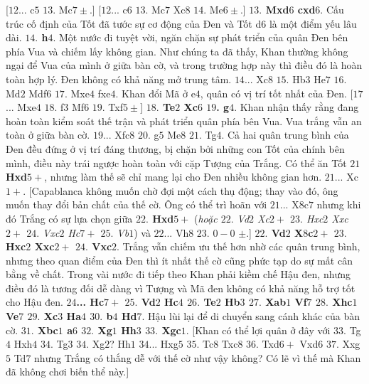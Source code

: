\begin{multicols}{2}
	\vskip 0.1cm
	[$12$... c$5$ $13.$ Mc$7\pm$.]
	\vskip 0.1cm
	[$12$... c$6$ $13.$ Mc$7$ Xc$8$ $14.$ Me$6 \pm$.]
	\vskip 0.1cm
	\textbf{\color{gocco}$13.$ Mxd$6$ cxd$6$}. Cấu trúc cố định của Tốt đã tước sự cơ động của Đen và Tốt d$6$ là một điểm yếu lâu dài.
	\vskip 0.1cm
	\textbf{\color{gocco}$14.$ h$4$}. Một nước đi tuyệt vời, ngăn chặn sự phát triển của quân Đen bên phía Vua và chiếm lấy không gian. Như chúng ta đã thấy, Khan thường không ngại để Vua của mình ở giữa bàn cờ, và trong trường hợp này thì điều đó là hoàn toàn hợp lý. Đen không có khả năng mở trung tâm. $14$... Xc$8$ $15.$ Hb$3$ He$7$ $16.$ Md$2$ Mdf$6$ $17.$ Mxe$4$ fxe$4$. Khan đổi Mã ở e$4$, quân có vị trí tốt nhất của Đen. 
	\vskip 0.1cm
	[$17$... Mxe$4$ $18.$ f$3$ Mf$6$ $19.$ Txf$5\pm$]
	\vskip 0.1cm
	\textbf{\color{gocco}$18.$ Te$2$ Xc$6$ $19$. g$4$}. Khan nhận thấy rằng đang hoàn toàn kiểm soát thế trận và phát triển quân phía bên Vua. Vua trắng vẫn an toàn ở giữa bàn cờ. $19$... Xfc$8$ $20.$ g$5$ Me$8$ $21.$ Tg$4$.
	\vskip 0.1cm 
	Cả hai quân trung bình của Đen đều đứng ở vị trí đáng thương, bị chặn bởi những con Tốt của chính bên mình, điều này trái ngược hoàn toàn với cặp Tượng của Trắng. Có thể ăn Tốt \textbf{\color{gocco}$21$ Hxd$5+$}, nhưng làm thế sẽ chỉ mang lại cho Đen nhiều không gian hơn. $21$... Xc$1+$. 
	\vskip 0.1cm
	[Capablanca không muốn chờ đợi một cách thụ động; thay vào đó, ông muốn thay đổi bản chất của thế cờ. Ông có thể trì hoãn với $21$... X$8$c$7$ nhưng khi đó Trắng có sự lựa chọn giữa  \textbf{\color{gocco}$22.$ Hxd$5+$}  (\textit{hoặc $22.$ Vd$2$ Xc$2+$ $23.$ Hxc$2$ Xxc$2+$ $24.$ Vxc$2$ Hc$7+$ $25.$ Vb$1$}) và $22$... Vh$8$ $23.$ $0-0$ $\pm$.]
	\vskip 0.1cm
	\textbf{\color{gocco}$22.$ Vd$2$ X$8$c$2+$ $23.$ Hxc$2$ Xxc$2+$ $24.$ Vxc$2$}. Trắng vẫn chiếm ưu thế hơn nhờ các quân trung bình, nhưng theo quan điểm của Đen thì ít nhất thế cờ cũng phức tạp do sự mất cân bằng về chất. Trong vài nước đi tiếp theo Khan phải kiềm chế Hậu đen, nhưng điều đó là tương đối dễ dàng vì Tượng và Mã đen không có khả năng hỗ trợ tốt cho Hậu đen. 
	\vskip 0.1cm
	\textbf{\color{gocco}$24$... Hc$7+$ $25.$ Vd$2$ Hc$4$ $26.$ Te$2$ Hb$3$ $27.$ Xab$1$ Vf$7$ $28.$ Xhc$1$ Ve$7$ $29.$ Xc$3$ Ha$4$ $30.$ b$4$ Hd$7$}. Hậu lùi lại để di chuyển sang cánh khác của bàn cờ. \textbf{\color{gocco}$31.$ Xbc$1$ a$6$ $32.$ Xg$1$ Hh$3$ $33.$ Xgc$1$}. 
	\vskip 0.1cm
	[Khan có thể lợi quân ở đây với $33.$ Tg$4$ Hxh$4$ $34.$ Tg$3$ $34.$ Xg$2$? Hh$1$ $34$... Hxg$5$ $35.$ Tc$8$ Txc$8$ $36.$ Txd$6+$ Vxd$6$ $37.$ Xxg$5$ Td$7$ nhưng Trắng có thắng dễ với thế cờ như vậy không? Có lẽ vì thế mà Khan đã không chơi biến thể này.]

\end{multicols}
